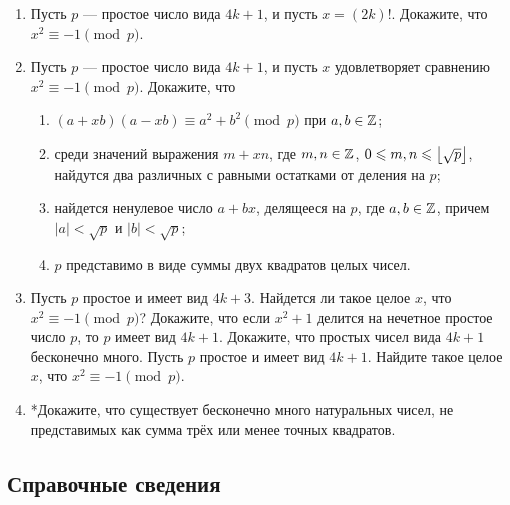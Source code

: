 \begin{enumerate}
\item Пусть $p$ --- простое число вида $4k+1$, и пусть $x=(2k)!$. Докажите, что $x^2\equiv -1\pmod p$.
\item Пусть $p$ --- простое число вида $4k+1$, и пусть $x$ удовлетворяет сравнению $x^2\equiv -1\pmod p$. Докажите, что \label{4kplus1}
\begin{enumerate}
\item $(a+xb)(a-xb) \equiv a^2+b^2 \pmod p$ при $a,b\in\mathbb Z$;
\item среди значений выражения $m+xn$, где $m,n\in\mathbb Z$, $0\leqslant m,n\leqslant\left\lfloor\sqrt p\right\rfloor$, найдутся два различных с равными остатками от деления на $p$;
\item найдется ненулевое число $a+bx$, делящееся на $p$, где $a,b\in\mathbb Z$, причем $|a|<\sqrt p$ и $|b|<\sqrt p$;
\item $p$ представимо в виде суммы двух квадратов целых чисел.
\end{enumerate}

\item \label{4kplus3} \ipunkt Пусть $p$ простое и имеет вид $4k + 3$. Найдется ли такое целое $x$, что $x^2 \equiv -1 \pmod p$?
\ipunkt Докажите, что если $x^2 + 1$ делится на нечетное простое число $p$, то $p$ имеет вид $4k + 1$.
\ipunkt Докажите, что простых чисел вида $4k + 1$ бесконечно много.
\ipunkt Пусть $p$ простое и имеет вид $4k + 1$. Найдите такое целое $x$, что $x^2 \equiv -1 \pmod p$.

\item *Докажите, что существует бесконечно много натуральных чисел, не представимых как сумма трёх или менее точных квадратов.

\end{enumerate}

\subsection*{Справочные сведения}

